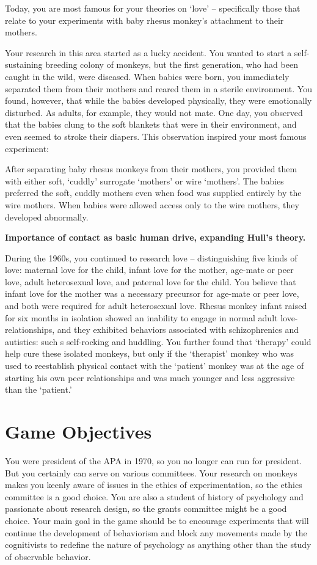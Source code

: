\begin{refsection}
Today, you are most famous for your theories on `love' – specifically those that relate to your experiments with baby rhesus monkey's attachment to their mothers.

Your research in this area started as a lucky accident. You wanted to start a self-sustaining breeding colony of monkeys, but the first generation, who had been caught in the wild, were diseased. When babies were born, you immediately separated them from their mothers and reared them in a sterile environment. You found, however, that while the babies developed physically, they were emotionally disturbed. As adults, for example, they would not mate. One day, you observed that the babies clung to the soft blankets that were in their environment, and even seemed to stroke their diapers. This observation inspired your most famous experiment:

After separating baby rhesus monkeys from their mothers, you provided them with either soft, `cuddly' surrogate `mothers' or wire `mothers'. The babies preferred the soft, cuddly mothers even when food was supplied entirely by the wire mothers. When babies were allowed access only to the wire mothers, they developed abnormally.

\textbf{Importance of contact as basic human drive, expanding Hull's theory.}

During the 1960s, you continued to research love – distinguishing five kinds of love: maternal love for the child, infant love for the mother, age-mate or peer love, adult heterosexual love, and paternal love for the child. You believe that infant love for the mother was a necessary precursor for age-mate or peer love, and both were required for adult heterosexual love. Rhesus monkey infant raised for six months in isolation showed an inability to engage in normal adult love-relationships, and they exhibited behaviors associated with schizophrenics and autistics: such s self-rocking and huddling. You further found that `therapy' could help cure these isolated monkeys, but only if the `therapist' monkey who was used to reestablish physical contact with the `patient' monkey was at the age of starting his own peer relationships and was much younger and less aggressive than the `patient.'

\section{Game Objectives}
\label{gameobjectives}

You were president of the APA in 1970, so you no longer can run for president. But you certainly can serve on various committees. Your research on monkeys makes you keenly aware of issues in the ethics of experimentation, so the ethics committee is a good choice. You are also a student of history of psychology and passionate about research design, so the grants committee might be a good choice. Your main goal in the game should be to encourage experiments that will continue the development of behaviorism and block any movements made by the cognitivists to redefine the nature of psychology as anything other than the study of observable behavior.


\end{refsection}
